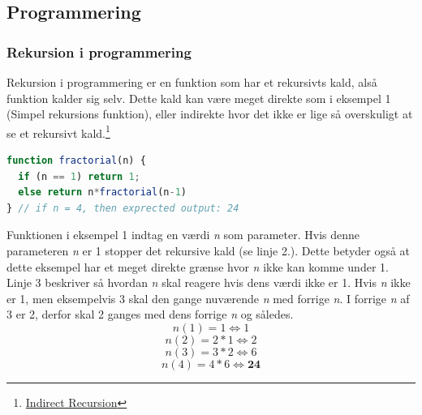 \documentclass[12pt]{article}
\begin{document}
\subsection{Programmering}
\subsubsection{Rekursion i programmering}\label{Rekursion i programmering}
Rekursion i programmering er en funktion som har et rekursivts kald, alså funktion kalder sig selv. Dette kald kan være meget direkte som i eksempel 1 (Simpel rekursions funktion), eller indirekte hvor det ikke er lige så overskuligt at se et rekursivt kald.\footnote{\href{https://www.oreilly.com/library/view/functional-programming-in/9780470971109/xhtml/sec55.html}{Indirect Recursion}}
\begin{lstlisting}[language=JavaScript, caption=Simpel rekursions funktion]
function fractorial(n) {        
  if (n == 1) return 1; 
  else return n*fractorial(n-1) 
} // if n = 4, then exprected output: 24
\end{lstlisting}
Funktionen i eksempel 1 indtag en værdi \textit{n} som parameter. Hvis denne parameteren \textit{n} er 1 stopper det rekursive kald (se linje 2.). Dette betyder også at dette eksempel har et meget direkte grænse hvor \textit{n} ikke kan komme under 1. Linje 3 beskriver så hvordan \textit{n} skal reagere hvis dens værdi ikke er 1. Hvis \textit{n} ikke er 1, men eksempelvis 3 skal den gange nuværende \textit{n} med forrige \textit{n}. I forrige \textit{n} af 3 er 2, derfor skal 2 ganges med dens forrige \textit{n} og således.
\[n(1) = 1 \Leftrightarrow 1\] 
\[n(2) = 2*1 \Leftrightarrow   2\]
\[n(3) = 3*2 \Leftrightarrow   6\]
\[n(4) = 4*6 \Leftrightarrow  \textbf{24}\]

\newpage
\end{document}

